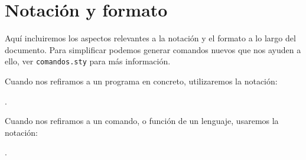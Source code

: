 \cleardoublepage

\section*{Notación y formato}

Aquí incluiremos los aspectos relevantes a la notación y el formato a
lo largo del documento. Para simplificar podemos generar comandos
nuevos que nos ayuden a ello, ver \texttt{comandos.sty} para más
información. 

Cuando nos refiramos a un programa en concreto, utilizaremos la
notación: 

.

Cuando nos refiramos a un comando, o función de un lenguaje, usaremos
la notación: 

.